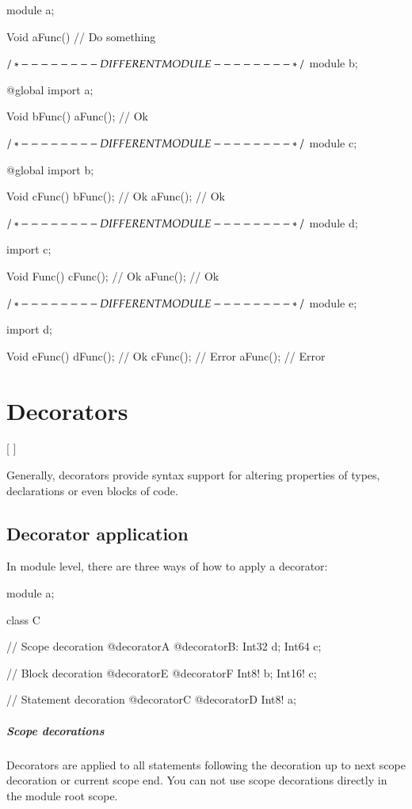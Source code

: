 \begin{code}
module a;

Void aFunc() {
	// Do something
}

$/* - - - - - - - - DIFFERENT MODULE - - - - - - - - */$
module b;

@global import a;

Void bFunc() {
	aFunc(); // Ok
}

$/* - - - - - - - - DIFFERENT MODULE - - - - - - - - */$
module c;

@global import b;

Void cFunc() {
	bFunc(); // Ok
	aFunc(); // Ok	
}

$/* - - - - - - - - DIFFERENT MODULE - - - - - - - - */$
module d;

import c;

Void Func() {
	cFunc(); // Ok
	aFunc(); // Ok
}

$/* - - - - - - - - DIFFERENT MODULE - - - - - - - - */$
module e;

import d;

Void eFunc() {
	dFunc(); // Ok
	cFunc(); // Error
	aFunc(); // Error	
}
\end{code}

\chapter{Decorators}
\begin{grammar}
	   [  ]
\end{grammar}

Generally, decorators provide syntax support for altering properties of types, declarations or even blocks of code.

\section{Decorator application}
In module level, there are three ways of how to apply a decorator:
\begin{code}
module a;

class C {
	
// Scope decoration
@decoratorA @decoratorB:
	Int32 d;
	Int64 c;
	
	// Block decoration
	@decoratorE @decoratorF {
		Int8! b;
		Int16! c;	
	}
	
	// Statement decoration
	@decoratorC @decoratorD Int8! a;
				
}
\end{code}

\paragraph{Scope decorations} Decorators are applied to all statements following the decoration up to next scope decoration or current scope end. You can not use scope decorations directly in the module root scope.

